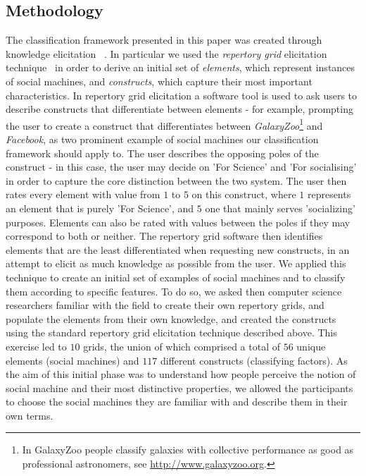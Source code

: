 \documentclass{sig-alternate}
\begin{document}
\subsection{Methodology}
\label{sec:methodology}
The classification framework presented in this paper was created through knowledge elicitation ~\cite{knowledgeelicitation}. In particular we used the {\it repertory grid} elicitation
technique~\cite{kelly} in order to derive an initial set of {\it elements}, which represent instances of social machines, and {\it constructs}, which capture their most important characteristics.
In repertory grid elicitation a software tool is used to ask users to describe constructs
that differentiate between elements - for example,  prompting the user to create a construct that
differentiates between {\it GalaxyZoo}\footnote{In GalaxyZoo people classify galaxies with collective performance as good as professional astronomers, see \url{http://www.galaxyzoo.org}.} and {\it Facebook}, as two prominent example of social machines our classification framework should apply to. The user describes the opposing poles of the construct - in this case, the user may decide on 'For Science' and 'For socialising' in order to capture the core distinction between the two system. The user then rates every element with value from $1$ to $5$ on this construct, where $1$ represents an element that is purely
'For Science', and $5$ one that mainly serves  'socializing' purposes. Elements can also be rated with values between the poles if they may correspond to both or neither. The repertory grid software then identifies elements that are the least differentiated when requesting new constructs, in an attempt to elicit as much knowledge as possible from the user. We applied this technique to create an initial set of examples of social machines and to classify them according to specific features. To do so, we asked then computer science researchers familiar with the field to create their own repertory grids, and populate the elements from their own knowledge, and created the constructs using the standard repertory grid elicitation technique described above. This exercise led to $10$ grids, the union of which comprised a total of $56$ unique elements (social machines)
and $117$ different constructs (classifying factors). As the aim of this initial phase was to understand how people perceive the notion of social machine and their most distinctive properties, we allowed the participants to choose the social machines they are familiar with and describe them in their own terms.
\end{document}
